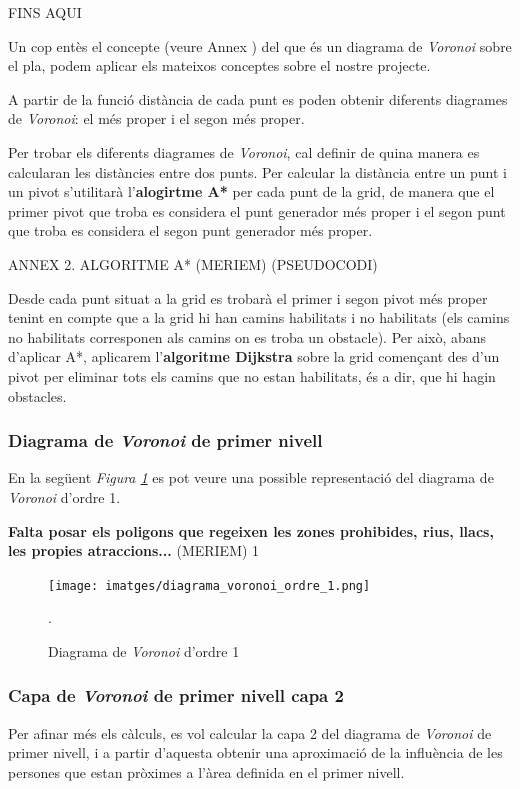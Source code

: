 \documentclass[12pt]{article}
\begin{document}
FINS AQUI

Un cop entès el concepte (veure Annex ) del que és un diagrama de \textit{Voronoi} sobre el pla, podem aplicar els mateixos conceptes sobre el nostre projecte. 

A partir de la funció distància de cada punt es poden obtenir diferents diagrames de \textit{Voronoi}: el més proper i el segon més proper. 

Per trobar els diferents diagrames de \textit{Voronoi}, cal definir de quina manera es calcularan les distàncies entre dos punts. Per calcular la distància entre un punt i un pivot s'utilitarà l'\textbf{alogirtme A*} per cada punt de la grid, de manera que el primer pivot que troba es considera el punt generador més proper i el segon punt que troba es considera el segon punt generador més proper.

ANNEX 2. ALGORITME A* (MERIEM) (PSEUDOCODI) 

Desde cada punt situat a la grid es trobarà el primer i segon pivot més proper tenint en compte que a la grid hi han camins habilitats i no habilitats (els camins no habilitats corresponen als camins on es troba un obstacle). Per això, abans d'aplicar A*, aplicarem l'\textbf{algoritme Dijkstra} sobre la grid començant des d'un pivot per eliminar tots els camins que no estan habilitats, és a dir, que hi hagin obstacles.

\subsubsection{Diagrama de \textit{Voronoi} de primer nivell} 

En la següent \textit{Figura \ref{fig:diagrama_voronoi_ordre_1}} es pot veure una possible representació del diagrama de \textit{Voronoi} d'ordre 1.

\textbf{Falta posar els poligons que regeixen les zones prohibides, rius, llacs, les propies atraccions...} (MERIEM)
1
\begin{figure}[H]
	\centering
	\texttt{[image: imatges/diagrama\_voronoi\_ordre\_1.png]}\par\vspace{1cm}
	\caption{Diagrama de \textit{Voronoi} d'ordre 1}.
	\label{fig:diagrama_voronoi_ordre_1}
\end{figure}

\subsubsection{Capa de \textit{Voronoi} de primer nivell capa 2}
Per afinar més els càlculs, es vol calcular la capa 2 del diagrama de \textit{Voronoi} de primer nivell, i a partir d'aquesta obtenir una aproximació de la influència de les persones que estan pròximes a l'àrea definida en el primer nivell.
\end{document}
